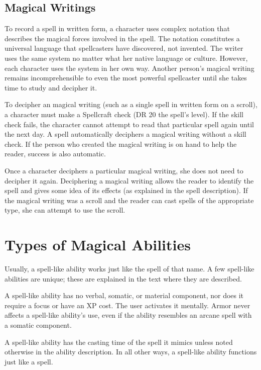 \subsection{Magical Writings}
To record a spell in written form, a character uses complex notation that describes the magical forces involved in the spell. The notation constitutes a universal language that spellcasters have discovered, not invented. The writer uses the same system no matter what her native language or culture. However, each character uses the system in her own way. Another person's magical writing remains incomprehensible to even the most powerful spellcaster until she takes time to study and decipher it.

To decipher an magical writing (such as a single spell in written form on a scroll), a character must make a Spellcraft check (DR 20 \add the spell's level). If the skill check fails, the character cannot attempt to read that particular spell again until the next day. A  spell automatically deciphers a magical writing without a skill check. If the person who created the magical writing is on hand to help the reader, success is also automatic.

Once a character deciphers a particular magical writing, she does not need to decipher it again. Deciphering a magical writing allows the reader to identify the spell and gives some idea of its effects (as explained in the spell description). If the magical writing was a scroll and the reader can cast spells of the appropriate type, she can attempt to use
the scroll.

\section{Types of Magical Abilities}

 Usually, a spell-like ability works just like the spell of that name. A few spell-like abilities are unique; these are explained in the text where they are described.

A spell-like ability has no verbal, somatic, or material component, nor does it require a focus or have an XP cost. The user activates it mentally. Armor never affects a spell-like ability's use, even if the ability resembles an arcane spell with a somatic component.

A spell-like ability has the casting time of the spell it mimics unless noted otherwise in the ability description. In all other ways, a spell-like ability functions just like a spell.

